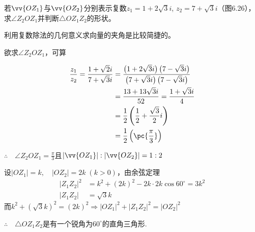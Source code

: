 \begin{example}
若$\vv{OZ_1}$与$\vv{OZ_2}$分别表示复数$z_1=1+2\sqrt{3}i$, $z_2=7+\sqrt{3}i$（图6.26），求$\angle Z_2OZ_1$并判断$\triangle OZ_1Z_2$的形状。
\end{example}

\begin{analyze}
    利用复数除法的几何意义求向量的夹角是比较简捷的。
\end{analyze}

\begin{solution}
欲求$\angle Z_2OZ_1$，可算  

\noindent
\begin{minipage}{.5\textwidth}
    \[\begin{split}
\frac{z_1}{z_2}=\frac{1+\sqrt{2}i}{7+\sqrt{3}i}&=\frac{\left(1+2\sqrt{3}i\right)\left(7-\sqrt{3}i\right)}{\left(7+\sqrt{3}i\right)\left(7-\sqrt{3}i\right)}\\
&=\frac{13+13\sqrt{3}i}{52}=\frac{1+\sqrt{3}i}{4}\\
&=\frac{1}{2}\left(\frac{1}{2}+\frac{\sqrt{3}}{2}i\right)\\
&=\frac{1}{2}\left(\pc{\frac{\pi}{3}}\right)
\end{split}\]
\end{minipage}\hfill
\begin{minipage}{.45\textwidth}
\centering
{}
\end{minipage}

$\therefore\quad \angle Z_2OZ_1=\frac{\pi}{3}$且$|\vv{OZ_1}|:|\vv{OZ_2}|=1:2$

设$|{OZ_1}|=k,\quad |OZ_2|=2k\; (k>0)$，由余弦定理
\[\begin{split}
    |Z_1Z_2|^2&=k^2+(2k)^2-2k\cdot 2k\cos60^{\circ}=3k^2\\
    |Z_1Z_2|&=\sqrt{3}k
\end{split}\]
而$k^2+\left(\sqrt{3}k\right)^2=(2k)^2 \Rightarrow |OZ_1|^2+|Z_1Z_2|^2=|OZ_2|^2$

$\therefore\quad \triangle OZ_1Z_2$是有一个锐角为$60^{\circ}$的直角三角形.
\end{solution}


